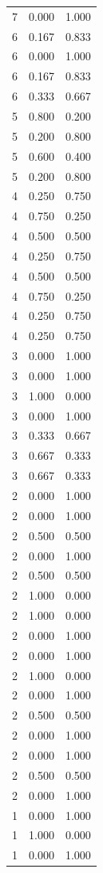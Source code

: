\begin{tabular}{rrr}
7 & 0.000 & 1.000 \\
6 & 0.167 & 0.833 \\
6 & 0.000 & 1.000 \\
6 & 0.167 & 0.833 \\
6 & 0.333 & 0.667 \\
5 & 0.800 & 0.200 \\
5 & 0.200 & 0.800 \\
5 & 0.600 & 0.400 \\
5 & 0.200 & 0.800 \\
4 & 0.250 & 0.750 \\
4 & 0.750 & 0.250 \\
4 & 0.500 & 0.500 \\
4 & 0.250 & 0.750 \\
4 & 0.500 & 0.500 \\
4 & 0.750 & 0.250 \\
4 & 0.250 & 0.750 \\
4 & 0.250 & 0.750 \\
3 & 0.000 & 1.000 \\
3 & 0.000 & 1.000 \\
3 & 1.000 & 0.000 \\
3 & 0.000 & 1.000 \\
3 & 0.333 & 0.667 \\
3 & 0.667 & 0.333 \\
3 & 0.667 & 0.333 \\
2 & 0.000 & 1.000 \\
2 & 0.000 & 1.000 \\
2 & 0.500 & 0.500 \\
2 & 0.000 & 1.000 \\
2 & 0.500 & 0.500 \\
2 & 1.000 & 0.000 \\
2 & 1.000 & 0.000 \\
2 & 0.000 & 1.000 \\
2 & 0.000 & 1.000 \\
2 & 1.000 & 0.000 \\
2 & 0.000 & 1.000 \\
2 & 0.500 & 0.500 \\
2 & 0.000 & 1.000 \\
2 & 0.000 & 1.000 \\
2 & 0.500 & 0.500 \\
2 & 0.000 & 1.000 \\
1 & 0.000 & 1.000 \\
1 & 1.000 & 0.000 \\
1 & 0.000 & 1.000 \\

\end{tabular}
